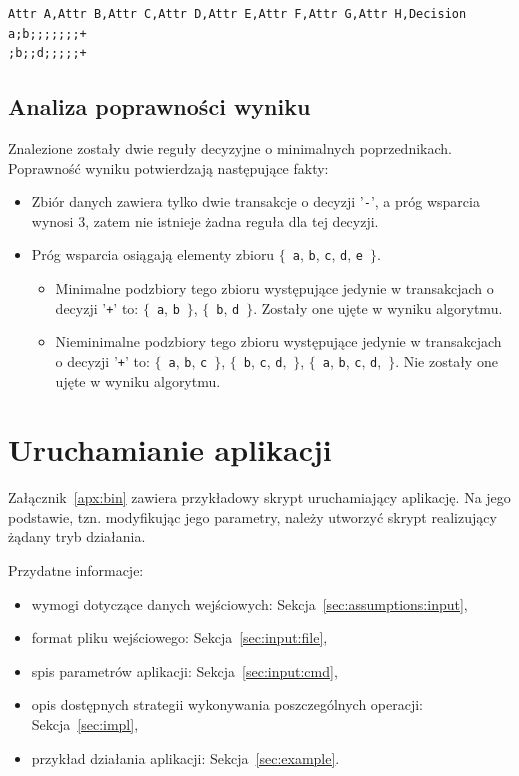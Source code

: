 \documentclass[a4paper,10pt]{article}
\begin{document}
\begin{verbatim}
Attr A,Attr B,Attr C,Attr D,Attr E,Attr F,Attr G,Attr H,Decision
a;b;;;;;;;+
;b;;d;;;;;+
\end{verbatim}


 \subsection{Analiza poprawności wyniku}
 Znalezione zostały dwie reguły decyzyjne o minimalnych poprzednikach.
 Poprawność wyniku potwierdzają następujące fakty:
 
 \begin{itemize}
  \item Zbiór danych zawiera tylko dwie transakcje o decyzji '\verb|-|', a próg wsparcia wynosi 3, zatem nie istnieje żadna reguła dla tej decyzji.
  \item Próg wsparcia osiągają elementy zbioru $\{$~\verb+a+, \verb+b+, \verb+c+, \verb+d+, \verb+e+~$\}$.
   \begin{itemize}
    \item Minimalne podzbiory tego zbioru występujące jedynie w transakcjach o decyzji '\verb|+|' to: $\{$~\verb+a+, \verb+b+~$\}$, $\{$~\verb+b+, \verb+d+~$\}$.
    Zostały one ujęte w wyniku algorytmu.
    \item Nieminimalne podzbiory tego zbioru występujące jedynie w transakcjach o decyzji '\verb|+|' to: $\{$~\verb+a+, \verb+b+, \verb+c+~$\}$, $\{$~\verb+b+, \verb+c+, \verb+d+,~$\}$, $\{$~\verb+a+, \verb+b+, \verb+c+, \verb+d+,~$\}$.
    Nie zostały one ujęte w wyniku algorytmu.
   \end{itemize}
 
 \end{itemize}



\section{Uruchamianie aplikacji}
Załącznik~\ref{apx:bin} zawiera przykładowy skrypt uruchamiający aplikację.
Na jego podstawie, tzn. modyfikując jego parametry, należy utworzyć skrypt realizujący żądany tryb działania.

Przydatne informacje:
\begin{itemize}
 \item wymogi dotyczące danych wejściowych: Sekcja~\ref{sec:assumptions:input},
 \item format pliku wejściowego: Sekcja~\ref{sec:input:file},
 \item spis parametrów aplikacji: Sekcja~\ref{sec:input:cmd},
 \item opis dostępnych strategii wykonywania poszczególnych operacji: Sekcja~\ref{sec:impl},
 \item przykład działania aplikacji: Sekcja~\ref{sec:example}.
\end{itemize}
\end{document}
